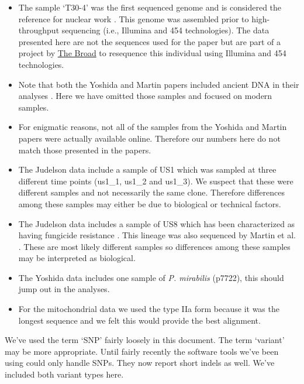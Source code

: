 \documentclass{article}\usepackage[]{graphicx}\usepackage[]{color}
\begin{document}
\begin{itemize}

\item The sample `T30-4' was the first sequenced genome and is considered the reference for nuclear work \cite{haas2009genome}.  This genome was assembled prior to high-throughput sequencing (i.e., Illumina and 454 technologies).  The data presented here are not the sequences used for the paper but are part of a project by \href{http://www.broadinstitute.org/annotation/genome/phytophthora_infestans/MultiHome.html}{The Broad} to resequence this individual using Illumina and 454 technologies.

\item Note that both the Yoshida and Martin papers included ancient DNA in their analyses \cite{yoshida2013correction, martin2013reconstructing}.  Here we have omitted those samples and focused on modern samples.

\item For enigmatic reasons, not all of the samples from the Yoshida and Martin papers were actually available online.  Therefore our numbers here do not match those presented in the papers.  

\item The Judelson data include a sample of US1 which was sampled at three different time points (us1\_1, us1\_2 and us1\_3).  We suspect that these were different samples and not necessarily the same clone.  Therefore differences among these samples may either be due to biological or technical factors.

\item The Judelson data includes a sample of US8 which has been characterized as having fungicide resistance \cite{danies2013phenotypic}.  This lineage was also sequenced by Martin et al. \cite{martin2013reconstructing}.  These are most likely different samples so differences among these samples may be interpreted as biological.  
  
\item The Yoshida data includes one sample of \emph{P. mirabilis} (p7722), this should jump out in the analyses.

\item For the mitochondrial data we used the type IIa form \cite{avila2006mitochondrial} because it was the longest sequence and we felt this would provide the best alignment.

\end{itemize}

We've used the term `SNP' fairly loosely in this document.  The term `variant' may be more appropriate.  Until fairly recently the software tools we've been using could only handle SNPs.  They now report short indels as well.  We've included both variant types here.
\end{document}

